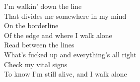 I'm walkin' down the line \\
That divides me somewhere in my mind \\
On the borderline \\
Of the edge and where I walk alone \\
Read between the lines \\
What's fucked up and everything's all right \\
Check my vital signs \\
To know I'm still alive, and I walk alone 
 